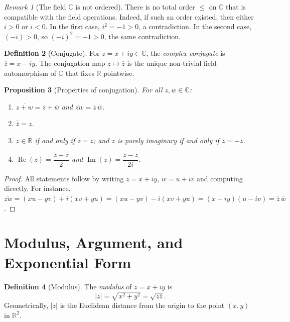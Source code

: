 \documentclass[12pt,a4paper,openany]{book}
\theoremstyle{definition}
\newtheorem{definition}{Definition}[chapter]
\theoremstyle{plain}
\newtheorem{proposition}[definition]{Proposition}
\theoremstyle{remark}
\newtheorem{remark}[definition]{Remark}
\newcommand{\C}{\mathbb{C}}
\newcommand{\R}{\mathbb{R}}
\DeclareMathOperator{\re}{Re}
\DeclareMathOperator{\im}{Im}
\newcommand{\abs}[1]{\left|#1\right|}
\newcommand{\conj}[1]{\overline{#1}}
\begin{document}
\begin{remark}[The field $\C$ is not ordered]
There is no total order $\leq$ on $\C$ that is compatible with the field operations. Indeed, if such an order existed, then either $i > 0$ or $i < 0$. In the first case, $i^2 = -1 > 0$, a contradiction. In the second case, $(-i)>0$, so $(-i)^2 = -1 > 0$, the same contradiction.
\end{remark}

\begin{definition}[Conjugate]
\label{def:conjugate}
For $z = x+iy\in\C$, the \emph{complex conjugate} is $\conj{z} = x - iy$. The conjugation map $z\mapsto\conj{z}$ is the unique non-trivial field automorphism of $\C$ that fixes $\R$ pointwise.
\end{definition}

\begin{proposition}[Properties of conjugation]
\label{prop:conjugation-props}
For all $z,w\in\C$:
\begin{enumerate}[label=\textup{(\roman*)}]
  \item $\conj{z+w} = \conj{z}+\conj{w}$ and $\conj{zw} = \conj{z}\,\conj{w}$.
  \item $\conj{\conj{z}} = z$.
  \item $z\in\R$ if and only if $\conj{z}=z$; and $z$ is purely imaginary if and only if $\conj{z}=-z$.
  \item $\re(z) = \dfrac{z+\conj{z}}{2}$ and $\im(z) = \dfrac{z-\conj{z}}{2i}$.
\end{enumerate}
\end{proposition}

\begin{proof}
All statements follow by writing $z=x+iy$, $w=u+iv$ and computing directly. For instance, $\conj{zw} = \conj{(xu-yv)+i(xv+yu)} = (xu-yv)-i(xv+yu) = (x-iy)(u-iv) = \conj{z}\,\conj{w}$.
\end{proof}

\section{Modulus, Argument, and Exponential Form}
\label{sec:modulus-argument}

\begin{definition}[Modulus]
\label{def:modulus}
The \emph{modulus} of $z = x+iy$ is
\[
  \abs{z} = \sqrt{x^2 + y^2} = \sqrt{z\conj{z}}.
\]
Geometrically, $\abs{z}$ is the Euclidean distance from the origin to the point $(x,y)$ in $\R^2$.
\end{definition}
\end{document}
